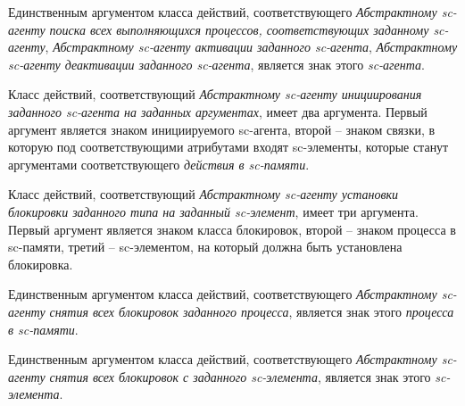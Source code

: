Единственным аргументом класса действий, соответствующего \textit{Абстрактному sc-агенту поиска всех выполняющихся процессов, соответствующих заданному sc-агенту}, \textit{Абстрактному sc-агенту активации заданного sc-агента}, \textit{Абстрактному sc-агенту деактивации заданного sc-агента}, является знак этого \textit{sc-агента}.

Класс действий, соответствующий \textit{Абстрактному sc-агенту инициирования заданного sc-агента на заданных аргументах}, имеет два аргумента. Первый аргумент является знаком инициируемого sc-агента, второй -- знаком связки, в которую под соответствующими атрибутами входят sc-элементы, которые станут аргументами соответствующего \textit{действия в sc-памяти}.

Класс действий, соответствующий \textit{Абстрактному sc-агенту установки блокировки заданного типа на заданный sc-элемент}, имеет три аргумента. Первый аргумент является знаком класса блокировок, второй -- знаком процесса в sc-памяти, третий -- sc-элементом, на который должна быть установлена блокировка.

Единственным аргументом класса действий, соответствующего \textit{Абстрактному sc-агенту снятия всех блокировок заданного процесса}, является знак этого \textit{процесса в sc-памяти}.

Единственным аргументом класса действий, соответствующего \textit{Абстрактному sc-агенту снятия всех блокировок с заданного sc-элемента}, является знак этого \textit{sc-элемента}.

